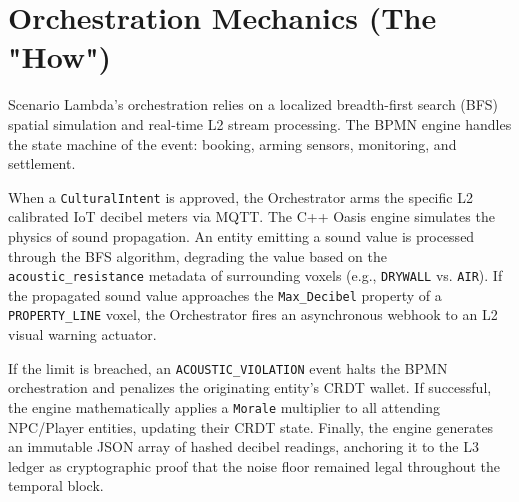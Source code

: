 \section{Orchestration Mechanics (The "How")}
Scenario Lambda's orchestration relies on a localized breadth-first search (BFS) spatial simulation and real-time L2 stream processing. The BPMN engine handles the state machine of the event: booking, arming sensors, monitoring, and settlement.

When a \texttt{CulturalIntent} is approved, the Orchestrator arms the specific L2 calibrated IoT decibel meters via MQTT. The C++ Oasis engine simulates the physics of sound propagation. An entity emitting a sound value is processed through the BFS algorithm, degrading the value based on the \texttt{acoustic\_resistance} metadata of surrounding voxels (e.g., \texttt{DRYWALL} vs. \texttt{AIR}). If the propagated sound value approaches the \texttt{Max\_Decibel} property of a \texttt{PROPERTY\_LINE} voxel, the Orchestrator fires an asynchronous webhook to an L2 visual warning actuator.

If the limit is breached, an \texttt{ACOUSTIC\_VIOLATION} event halts the BPMN orchestration and penalizes the originating entity's CRDT wallet. If successful, the engine mathematically applies a \texttt{Morale} multiplier to all attending NPC/Player entities, updating their CRDT state. Finally, the engine generates an immutable JSON array of hashed decibel readings, anchoring it to the L3 ledger as cryptographic proof that the noise floor remained legal throughout the temporal block.

